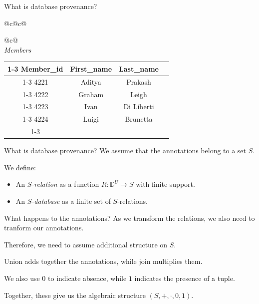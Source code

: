 \documentclass{beamer}
\begin{document}
\begin{frame}{What is database provenance?}
{\begin{tabular}{@{}c@{\hspace{1.5cm}}c@{}}
\begin{tabular}{@{}c@{}}
        \\[1.8cm]

        \textit{Members} \\[0.15cm]
        \begin{tabular}{|c|c|c|c}
          \cline{1-3}
          \textbf{Member\_id} & \textbf{First\_name} & \textbf{Last\_name} &                     \\ \cline{1-3}
          4221                & Aditya               & Prakash             & \uncover<2->{$m_1$} \\ \cline{1-3}
          4222                & Graham               & Leigh               & \uncover<2->{$m_2$} \\ \cline{1-3}
          4223                & Ivan                 & Di Liberti          & \uncover<2->{$m_3$} \\ \cline{1-3}
          4224                & Luigi                & Brunetta            & \uncover<2->{$m_4$} \\ \cline{1-3}
        \end{tabular}
      \end{tabular}
    \end{tabular}
  }
\end{frame}

\begin{frame}{What is database provenance?}
  We assume that the annotations belong to a set $S$.\pause

  \bigskip

  We define:\pause
  \begin{itemize}
    \item An \emph{$S$-relation} as a function $R : \mathbb{D}^U \to S$ with finite support.\pause
    \item An \emph{$S$-database} as a finite set of $S$-relations.
  \end{itemize}
\end{frame}

\begin{frame}{What happens to the annotations?}
  As we transform the relations, we also need to tranform our annotations.\pause

  Therefore, we need to assume additional structure on $S$.\pause

  \bigskip
  Union adds together the annotations, while join multiplies them.\pause

  We also use $0$ to indicate absence, while $1$ indicates the presence of a tuple.\pause

  Together, these give us the algebraic structure $(S, +, \cdot, 0, 1)$.
\end{frame}
\end{document}
